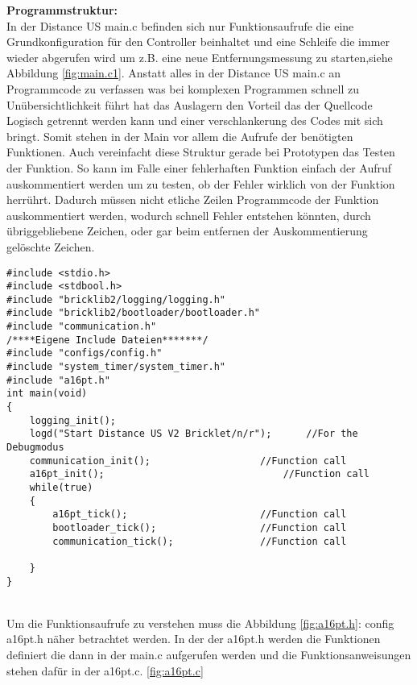 \textbf{Programmstruktur:}\\
In der  Distance US main.c befinden sich nur Funktionsaufrufe die eine Grundkonfiguration  für den Controller beinhaltet und eine Schleife die immer wieder abgerufen wird um z.B. eine neue Entfernungsmessung zu starten,siehe Abbildung \ref{fig:main.c1}.
Anstatt alles in der Distance US main.c an Programmcode zu verfassen was bei  komplexen Programmen schnell zu Unübersichtlichkeit führt hat das Auslagern den Vorteil das der Quellcode Logisch getrennt werden kann und einer verschlankerung des Codes mit sich bringt. 
Somit stehen in der Main  vor allem die Aufrufe der benötigten Funktionen. 
Auch vereinfacht diese Struktur gerade bei Prototypen das Testen der Funktion. So kann im Falle einer fehlerhaften Funktion einfach der Aufruf auskommentiert werden um zu testen, ob der Fehler wirklich von der Funktion herrührt. Dadurch müssen nicht etliche Zeilen Programmcode der Funktion auskommentiert werden, wodurch schnell Fehler entstehen könnten, durch übriggebliebene Zeichen, oder gar beim entfernen der Auskommentierung gelöschte Zeichen.\\
\begin{minipage}{1\textwidth}
\begin{lstlisting}
#include <stdio.h>
#include <stdbool.h>
#include "bricklib2/logging/logging.h"
#include "bricklib2/bootloader/bootloader.h"
#include "communication.h"
/****Eigene Include Dateien*******/
#include "configs/config.h"
#include "system_timer/system_timer.h"
#include "a16pt.h"
int main(void)
{ 
	logging_init(); 
	logd("Start Distance US V2 Bricklet/n/r");  	//For the Debugmodus
	communication_init(); 					//Function call
	a16pt_init(); 								//Function call	
	while(true)
	{
		a16pt_tick(); 						//Function call
		bootloader_tick(); 					//Function call
		communication_tick(); 				//Function call
		
	}
}
\end{lstlisting}
\label{fig:main.c1}
\end{minipage}\\
Um die Funktionsaufrufe zu verstehen muss die Abbildung \ref{fig:a16pt.h}: config a16pt.h näher betrachtet werden.
In der der a16pt.h werden die Funktionen definiert die dann in der main.c aufgerufen werden und die Funktionsanweisungen stehen dafür in der a16pt.c. \ref{fig:a16pt.c}\\
